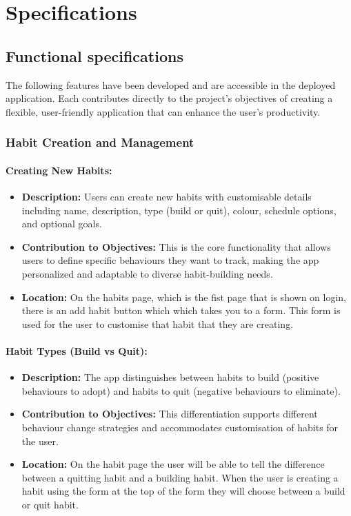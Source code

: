 \chapter{Specifications}
\label{chap:specifications}

\section{Functional specifications}
\label{sect:functional-specifications}
The following features have been developed and are accessible in the deployed application. Each contributes directly to the project's objectives of creating a flexible, user-friendly application that can enhance the user's productivity.

\subsection{Habit Creation and Management}
\subsubsection{Creating New Habits:}
\begin{itemize}
    \item \textbf{Description:} Users can create new habits with customisable details including name, description, type (build or quit), colour, schedule options, and optional goals.
    \item \textbf{Contribution to Objectives:} This is the core functionality that allows users to define specific behaviours they want to track, making the app personalized and adaptable to diverse habit-building needs.
    \item \textbf{Location:} On the habits page, which is the fist page that is shown on login, there is an add habit button which which takes you to a form. This form is used for the user to customise that habit that they are creating.
\end{itemize}

\subsubsection{Habit Types (Build vs Quit):}
\begin{itemize}
    \item \textbf{Description:} The app distinguishes between habits to build (positive behaviours to adopt) and habits to quit (negative behaviours to eliminate).
    \item \textbf{Contribution to Objectives:} This differentiation supports different behaviour change strategies and accommodates customisation of habits for the user.
    \item \textbf{Location:} On the habit page the user will be able to tell the difference between a quitting habit and a building habit. When the user is creating a habit using the form at the top of the form they will choose between a build or quit habit.
\end{itemize}

